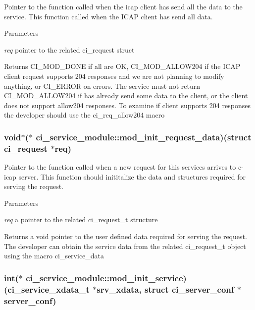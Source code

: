 Pointer to the function called when the icap client has send all the data to the service. This function called when the ICAP client has send all data. 
\begin{DoxyParams}{Parameters}
\item[{\em req}]pointer to the related ci\_\-request struct \end{DoxyParams}
\begin{DoxyReturn}{Returns}
CI\_\-MOD\_\-DONE if all are OK, CI\_\-MOD\_\-ALLOW204 if the ICAP client request supports 204 responses and we are not planning to modify anything, or CI\_\-ERROR on errors. The service must not return CI\_\-MOD\_\-ALLOW204 if has already send some data to the client, or the client does not support allow204 responses. To examine if client supports 204 responses the developer should use the ci\_\-req\_\-allow204 macro 
\end{DoxyReturn}
\hypertarget{structci__service__module_a0ab686479bbf157f12c5913efd396c96}{
\subsubsection[{mod\_\-init\_\-request\_\-data}]{\setlength{\rightskip}{0pt plus 5cm}void$\ast$($\ast$ {\bf ci\_\-service\_\-module::mod\_\-init\_\-request\_\-data})(struct ci\_\-request $\ast$req)}}
\label{structci__service__module_a0ab686479bbf157f12c5913efd396c96}


Pointer to the function called when a new request for this services arrives to c-\/icap server. This function should inititalize the data and structures required for serving the request. 
\begin{DoxyParams}{Parameters}
\item[{\em req}]a pointer to the related ci\_\-request\_\-t structure \end{DoxyParams}
\begin{DoxyReturn}{Returns}
a void pointer to the user defined data required for serving the request. The developer can obtain the service data from the related ci\_\-request\_\-t object using the macro ci\_\-service\_\-data 
\end{DoxyReturn}
\hypertarget{structci__service__module_acf9f56283f9418715be2f87967928876}{
\subsubsection[{mod\_\-init\_\-service}]{\setlength{\rightskip}{0pt plus 5cm}int($\ast$ {\bf ci\_\-service\_\-module::mod\_\-init\_\-service})({\bf ci\_\-service\_\-xdata\_\-t} $\ast$srv\_\-xdata, struct {\bf ci\_\-server\_\-conf} $\ast$server\_\-conf)}}
\label{structci__service__module_acf9f56283f9418715be2f87967928876}


